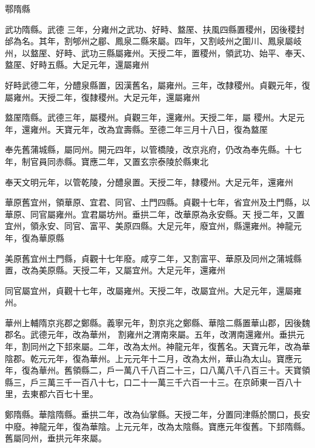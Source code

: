 \begin{pinyinscope}
 鄠隋縣



 武功隋縣。武德
 三年，分雍州之武功、好畤、盩厔、扶風四縣置稷州，因後稷封邰為名。其年，割郇州之郿、鳳泉二縣來屬。四年，又割岐州之圍川、鳳泉屬岐州，以盩厔、好畤、武功三縣屬雍州。天授二年，置稷州，領武功、始平、奉天、盩厔、好畤五縣。大足元年，還屬雍州



 好畤武德二年，分醴泉縣置，因漢舊名，屬雍州。三年，改隸稷州。貞觀元年，復屬雍州。天授二年，復隸稷州。大足元年，還屬雍州



 盩厔隋縣。武德三年，屬稷州。貞觀三年，還雍州。天授二年，屬
 稷州。大足元年，還雍州。天寶元年，改為宜壽縣。至德二年三月十八日，復為盩厔



 奉先舊蒲城縣，屬同州。開元四年，以管橋陵，改京兆府，仍改為奉先縣。十七年，制官員同赤縣。寶應二年，又置玄宗泰陵於縣東北



 奉天文明元年，以管乾陵，分醴泉置。天授二年，隸稷州。大足元年，還雍州



 華原舊宜州，領華原、宜君、同官、土門四縣。貞觀十七年，省宜州及土門縣，以華原、同官屬雍州。宜君屬坊州。垂拱二年，改華原為永安縣。天
 授二年，又置宜州，領永安、同官、富平、美原四縣。大足元年，廢宜州，縣還雍州。神龍元年，復為華原縣



 美原舊宜州土門縣，貞觀十七年廢。咸亨二年，又割富平、華原及同州之蒲城縣置，改為美原縣。天授二年，又屬宜州。大足元年，還雍州



 同官屬宜州，貞觀十七年，改屬雍州。天授二年，改屬宜州。大足元年，還屬雍州。



 華州上輔隋京兆郡之鄭縣。義寧元年，割京兆之鄭縣、華陰二縣置華山郡，因後魏郡名。武德元年，改為華州，
 割雍州之渭南來屬。五年，改渭南還雍州。垂拱元年，割同州之下邽來屬。二年，改為太州。神龍元年，復舊名。天寶元年，改為華陰郡。乾元元年，復為華州。上元元年十二月，改為太州，華山為太山。寶應元年，復為華州。舊領縣二，戶一萬八千八百二十三，口八萬八千八百三十。天寶領縣三，戶三萬三千一百八十七，口二十一萬三千六百一十三。在京師東一百八十里，去東都六百七十里。



 鄭隋縣。華陰隋縣。垂拱二年，改為仙掌縣。天授二年，分置同津縣於關口，長安中廢。神龍元年，復為華陰。上元元年，改為太陰縣。寶應元年復舊。下邽隋縣。舊屬同州，垂拱元年來屬。




\end{pinyinscope}
